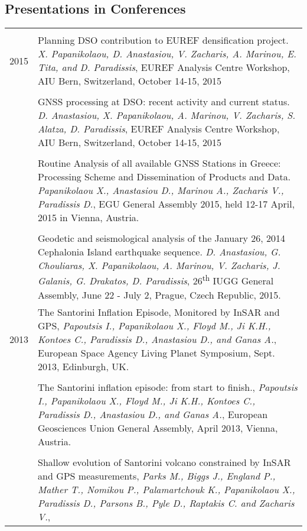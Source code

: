 \documentclass[9pt]{extarticle} %
\begin{document}
\subsection*{Presentations in Conferences}
%
\begin{longtable}{r|p{14cm}}
\multicolumn{2}{c}{} \\ 
  \textsc{2015}
%
  & Planning DSO contribution to EUREF densification project.
  \emph{X. Papanikolaou, D. Anastasiou, V. Zacharis, A. Marinou, E. Tita, and D. Paradissis},
  EUREF Analysis Centre Workshop, AIU Bern, Switzerland, October 14-15, 2015\\
%
  &\\
%
  & GNSS processing at DSO: recent activity and current status.
  \emph{D. Anastasiou, X. Papanikolaou, A. Marinou, V. Zacharis, S. Alatza, D. Paradissis},
  EUREF Analysis Centre Workshop, AIU Bern, Switzerland, October 14-15, 2015\\
%
  &\\
%
  & Routine Analysis of all available GNSS Stations in Greece: Processing Scheme and Dissemination of Products and Data.
  \emph{Papanikolaou X., Anastasiou D., Marinou A., Zacharis V., Paradissis D.},
  EGU General Assembly 2015, held 12-17 April, 2015 in Vienna, Austria.\\
%
  &\\
%
  & Geodetic and seismological analysis of the January 26, 2014 Cephalonia Island earthquake sequence.
  \emph{D. Anastasiou, G. Chouliaras, X. Papanikolaou, A. Marinou, V. Zacharis, J. Galanis, G. Drakatos, D. Paradissis},
  26\textsuperscript{th} IUGG General Assembly, June 22 - July 2, Prague, Czech Republic, 2015.\\
%  
  \textsc{2013}
  & The Santorini Inflation Episode, Monitored by InSAR and GPS,
  \emph{Papoutsis I., Papanikolaou X., Floyd M., Ji K.H., Kontoes C., Paradissis D., Anastasiou D., and Ganas A.},
  European Space Agency Living Planet Symposium, Sept. 2013, Edinburgh, UK.\\
%
  &\\
%
  & The Santorini inflation episode: from start to finish.,
  \emph{Papoutsis I., Papanikolaou X., Floyd M., Ji K.H., Kontoes C., Paradissis D., Anastasiou D., and Ganas A.},
  European Geosciences Union General Assembly, April 2013, Vienna, Austria.\\
%
  &\\
%
  & Shallow evolution of Santorini volcano constrained by InSAR and GPS measurements,
  \emph{Parks M., Biggs J., England P., Mather T., Nomikou P., Palamartchouk K., Papanikolaou X., Paradissis D., Parsons B., Pyle D., Raptakis C. and Zacharis V.},

\end{longtable}
\end{document}
